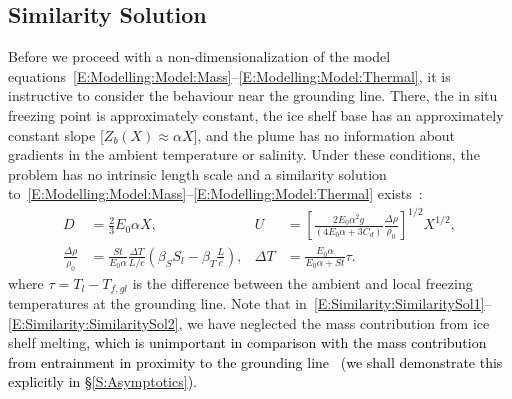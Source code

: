 \documentclass[openacc]{rsproca_new}%
\newcommand{\red}[1]{{\color{red} #1}}
\newcommand{\blue}[1]{{\color{blue} #1}}
\newcommand{\rout}[1]{\red{\st{#1}}}\newcommand{\ab}[1]{\textcolor{Green}{#1}}\newcommand{\about}[1]{\textcolor{Cyan}{\sout{#1}}}
\renewcommand{\rout}[1]{{}} %
\renewcommand{\blue}[1]{{\textcolor{black}{#1}}} %
\renewcommand{\red}[1]{{}} %
\begin{document}
\subsection{Similarity Solution}\label{S:Model:SimilaritySolution}
Before we proceed with a non-dimensionalization of the model equations~\eqref{E:Modelling:Model:Mass}--\eqref{E:Modelling:Model:Thermal}, it is instructive to consider the behaviour near the grounding line. There, the in situ freezing point is approximately constant, the ice shelf base has an approximately constant slope [$Z_b(X) \approx \alpha X$], and the plume has no information about gradients in the ambient temperature or salinity. Under these conditions, the problem has no intrinsic length scale and a similarity solution to~\eqref{E:Modelling:Model:Mass}--\eqref{E:Modelling:Model:Thermal} exists~\cite{Magorrian2016JGeoResOcean}:
\begin{align}
D &= \frac{2}{3}E_0 \alpha X, & U &= \left[\frac{2E_0 \alpha^2 g}{\left(4E_0 \alpha + 3 C_d\right)} \frac{\Delta \rho}{\rho_0}\right]^{1/2}X^{1/2},\label{E:Similarity:SimilaritySol1}\\
 \frac{\Delta \rho}{\rho_0} &= \frac{St}{E_0 \alpha}\frac{\Delta T}{L/c}\left(\beta_S S_l - \beta_T \frac{L}{c}\right), & \Delta T &= \frac{E_0 \alpha}{E_0 \alpha + St}\tau.\label{E:Similarity:SimilaritySol2}
\end{align}
where $\tau = T_l - T_{f,gl}$ is the difference between the ambient and local freezing temperatures at the grounding line. Note that in~\eqref{E:Similarity:SimilaritySol1}--\eqref{E:Similarity:SimilaritySol2}, we have neglected the mass contribution from ice shelf melting\blue{, which is unimportant in comparison with the mass contribution from entrainment in proximity to the grounding line~\cite{Hewitt2020AnnRevFlu}}\rout{;} \blue{(we shall demonstrate this explicitly in \S\ref{S:Asymptotics}).} \rout{ that this is reasonable for locations close to the grounding line.}
\end{document}
